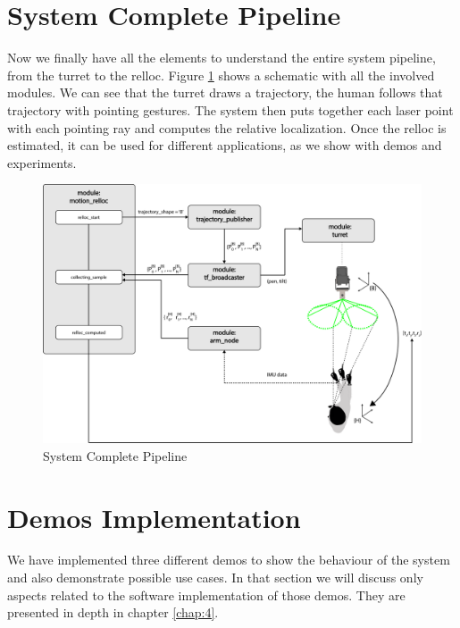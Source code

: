 \section{System Complete Pipeline}
Now we finally have all the elements to understand the entire system pipeline, from the turret to the \ac{relloc}. Figure \ref{fig:systemBigPicture} shows a schematic with all the involved modules. We can see that the turret draws a trajectory, the human follows that trajectory with pointing gestures. The system then puts together each laser point with each pointing ray and computes the relative localization. Once the \ac{relloc} is estimated, it can be used for different applications, as we show with demos and experiments.
\begin{figure}
	\centering
	\includegraphics[width=\textwidth]{img/systemPipeline.png}%
	\caption{System Complete Pipeline}
	\label{fig:systemBigPicture}
\end{figure}

\section{Demos Implementation}
We have implemented three different demos to show the behaviour of the system and also demonstrate possible use cases. In that section we will discuss only aspects related to the software implementation of those demos. They are presented in depth in chapter \ref{chap:4}. 
